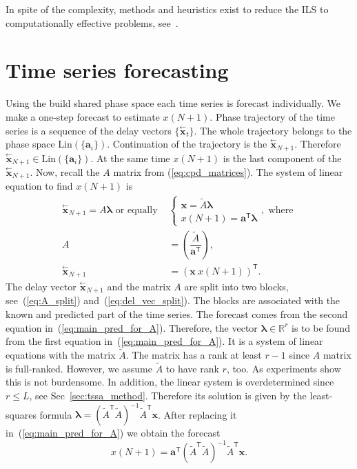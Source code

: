 \documentclass[referee, pdflatex, sn-mathphys-num]{sn-jnl}
\theoremstyle{definition}
\theoremstyle{plain}
\newcommand{\delayV}[1]{\overset{\leftarrow}{\mathbf{x}}_{#1}}
\begin{document}
	In spite of the complexity, methods and heuristics exist to reduce the ILS to computationally effective problems, see~\cite{Grafarend2022}.
	
	\section{Time series forecasting}\label{sec:tssa_forecast}
	
	Using the build shared phase space each time series is forecast individually. We make a one-step forecast to estimate $ x(N + 1) $. Phase trajectory of the time series is a sequence of the delay vectors $ \{ \delayV{t} \} $. The whole trajectory belongs to the phase space $ \text{Lin}(\{\mathbf{a}_i\}) $. Continuation of the trajectory is the $ \delayV{N + 1} $. Therefore $ \delayV{N + 1} \in \text{Lin}(\{\mathbf{a}_i\}) $. At the same time $ x(N + 1) $ is the last component of the $ \delayV{N + 1} $. Now, recall the $ A $ matrix from (\ref{eq:cpd_matrices}). The system of linear equation to find $ x(N + 1) $ is \begin{align}\label{eq:main_pred_for_A}
		\delayV{N + 1} = A \boldsymbol{\lambda} \text{ or equally } &\begin{cases}
			\mathbf{x} = \tilde{A} \boldsymbol{\lambda}  \\
			x(N + 1) = \mathbf{a}^{\mathsf{T}} \boldsymbol{\lambda}
		\end{cases}, \text{ where } \\
		A &= \left( \dfrac{\tilde{A}}{\mathbf{a}^{\mathsf{T}}} \right), \label{eq:A_split} \\
		\delayV{N + 1} &= (\mathbf{x} \  x(N + 1))^{\mathsf{T}}. \label{eq:del_vec_split}
	\end{align}	The delay vector $ \delayV{N + 1} $ and the matrix $ A $ are split into two blocks, see~(\ref{eq:A_split}) and~(\ref{eq:del_vec_split}). The blocks are associated with the known and predicted part of the time series. The forecast comes from the second equation in~(\ref{eq:main_pred_for_A}). Therefore, the vector $ \boldsymbol{\lambda} \in \mathbb{R}^r $ is to be found from the first equation in~(\ref{eq:main_pred_for_A}). It is a system of linear equations with the matrix $ \tilde{A} $. The matrix has a rank at least $ r - 1 $ since $ A $ matrix is full-ranked. However, we assume $ \tilde{A} $ to have rank $ r $, too. As experiments show this is not burdensome. In addition, the linear system is overdetermined since $ r \le L $, see  Sec~\ref{sec:tssa_method}. Therefore its solution is given by the least-squares formula $ \boldsymbol{\lambda} = (\tilde{A}^{\mathsf{T}} \tilde{A})^{-1} \tilde{A}^{\mathsf{T}} \mathbf{x} $. After replacing it in~(\ref{eq:main_pred_for_A}) we obtain the forecast \begin{equation}\label{eq:tssa_pred}
		x(N + 1) = \mathbf{a}^{\mathsf{T}} (\tilde{A}^{\mathsf{T}} \tilde{A})^{-1} \tilde{A}^{\mathsf{T}} \mathbf{x}.
	\end{equation}
	
\end{document}
